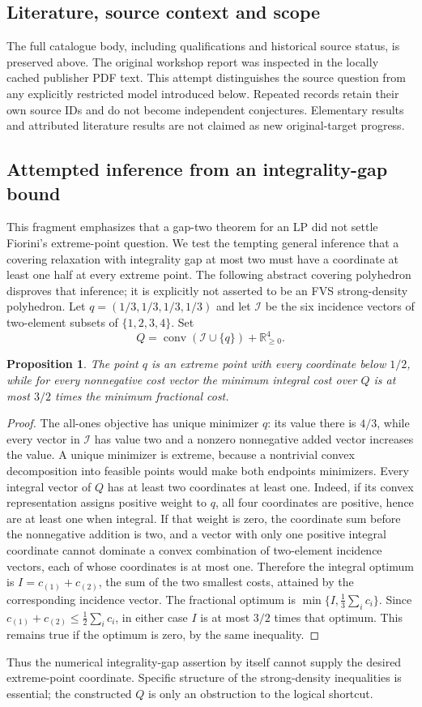 \documentclass[11pt]{article}
\newtheorem{proposition}{Proposition}
\begin{document}
\subsection{Literature, source context and scope}
The full catalogue body, including qualifications and historical source status, is preserved above. The original workshop report was inspected in the locally cached publisher PDF text. This attempt distinguishes the source question from any explicitly restricted model introduced below. Repeated records retain their own source IDs and do not become independent conjectures. Elementary results and attributed literature results are not claimed as new original-target progress.

\subsection{Attempted inference from an integrality-gap bound}
This fragment emphasizes that a gap-two theorem for an LP did not settle Fiorini's extreme-point question. We test the tempting general inference that a covering relaxation with integrality gap at most two must have a coordinate at least one half at every extreme point. The following abstract covering polyhedron disproves that inference; it is explicitly not asserted to be an FVS strong-density polyhedron.
Let $q=(1/3,1/3,1/3,1/3)$ and let $\mathcal I$ be the six incidence vectors of two-element subsets of $\{1,2,3,4\}$. Set
\[
 Q=\operatorname{conv}(\mathcal I\cup\{q\})+\mathbb R_{\ge0}^4.
\]
\begin{proposition}
The point $q$ is an extreme point with every coordinate below $1/2$, while for every nonnegative cost vector the minimum integral cost over $Q$ is at most $3/2$ times the minimum fractional cost.
\end{proposition}
\begin{proof}
The all-ones objective has unique minimizer $q$: its value there is $4/3$, while every vector in $\mathcal I$ has value two and a nonzero nonnegative added vector increases the value. A unique minimizer is extreme, because a nontrivial convex decomposition into feasible points would make both endpoints minimizers.
Every integral vector of $Q$ has at least two coordinates at least one. Indeed, if its convex representation assigns positive weight to $q$, all four coordinates are positive, hence are at least one when integral. If that weight is zero, the coordinate sum before the nonnegative addition is two, and a vector with only one positive integral coordinate cannot dominate a convex combination of two-element incidence vectors, each of whose coordinates is at most one. Therefore the integral optimum is $I=c_{(1)}+c_{(2)}$, the sum of the two smallest costs, attained by the corresponding incidence vector.
The fractional optimum is $\min\{I,\tfrac13\sum_i c_i\}$. Since $c_{(1)}+c_{(2)}\le\tfrac12\sum_i c_i$, in either case $I$ is at most $3/2$ times that optimum. This remains true if the optimum is zero, by the same inequality.
\end{proof}
Thus the numerical integrality-gap assertion by itself cannot supply the desired extreme-point coordinate. Specific structure of the strong-density inequalities is essential; the constructed $Q$ is only an obstruction to the logical shortcut.
\end{document}

